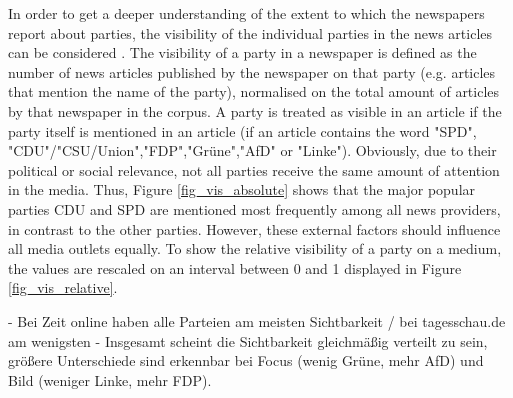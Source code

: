 \documentclass[12pt,a4paper,notitlepage]{article}
\begin{document}
In order to get a deeper understanding of the extent to which the newspapers report about parties, the visibility of the individual parties in the news articles can be considered \citep{eberl_one_2017, junque_de_fortuny_media_2012, dalessio_media_2000}. The visibility of a party in a newspaper is defined as the number of news articles published by the newspaper on that party (e.g. articles that mention the name of the party), normalised on the total amount of articles by that newspaper in the corpus. A party is treated as visible in an article if the party itself is mentioned in an article (if an article contains the word "SPD", "CDU"/"CSU/Union","FDP","Grüne","AfD" or "Linke"). Obviously, due to their political or social relevance, not all parties receive the same amount of attention in the media. Thus, Figure \ref{fig_vis_absolute} shows that the major popular parties CDU and SPD are mentioned most frequently among all news providers, in contrast to the other parties. However, these external factors should influence all media outlets equally. To show the relative visibility of a party on a medium, the values are rescaled on an interval between 0 and 1 displayed in Figure \ref{fig_vis_relative}. 

- Bei Zeit online haben alle Parteien am meisten Sichtbarkeit / bei tagesschau.de am wenigsten
- Insgesamt scheint die Sichtbarkeit gleichmäßig verteilt zu sein, größere Unterschiede sind erkennbar bei Focus (wenig Grüne, mehr AfD) und Bild (weniger Linke, mehr FDP).
\end{document}
